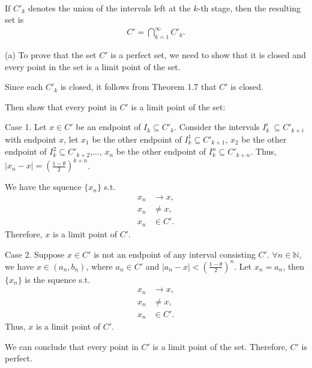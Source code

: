 \documentclass[UTF8,a4paper,10pt]{article}
\begin{document}
  \begin{solution}\,

  If \(C'_k\) denotes the union of the intervals left at the
$k$-th stage, then the resulting set is
\begin{equation*}
  \begin{aligned}
    C' =  \bigcap_{k=1}^{\infty} C'_k  .
  \end{aligned}
\end{equation*}


  (a) To prove that the set \(C'\) is a perfect set, we need to show that it is closed and every point in the set is a limit point of the set.

  Since each \(C'_k\) is closed, it follows from Theorem 1.7 that \(C'\) is closed. 

  Then show that every point in \(C'\) is a limit point of the set:

  Case 1. Let \(x\in C'\) be an endpoint of \(I_k\subseteq C'_k\). Consider the intervals \(I_k^i\ \subseteq C'_{k+i}\) with endpoint \(x\), let \(x_1\) be the other endpoint of \(I_k^1\subseteq C'_{k+1}\), \(x_2\) be the other endpoint of \(I_k^2\subseteq C'_{k+2}\),..., \(x_n\) be the other endpoint of \(I_k^n
  \subseteq C'_{k+n}\).
  Thus, \(|x_n-x|=(\frac{1-\theta}{2})^{k+n}\).

  We have the squence \(\{x_n\}\) s.t. 
  \begin{equation*}
    \begin{aligned}
      x_n&\to x,\\
      x_n&\neq x,\\
      x_n&\in C'.
    \end{aligned}
  \end{equation*}
  Therefore, \(x\) is a limit point of \(C'\).

  Case 2. Suppose \(x\in C'\) is not an endpoint of any interval consisting \(C'\). \(\forall n\in\mathbb{N}\), we have \(x\in (a_n, b_n)\), where \(a_n\in C'\) and \(|a_n-x|<(\frac{1-\theta}{2})^{n}\). Let \(x_n = a_n\), then \(\{x_n\}\) is the squence s.t. 
  \begin{equation*}
    \begin{aligned}
      x_n&\to x,\\
      x_n&\neq x,\\
      x_n&\in C'.
    \end{aligned}
  \end{equation*}
  Thus, \(x\) is a limit point of \(C'\).

  We can conclude that every point in \(C'\) is a limit point of the set. Therefore, \(C'\) is perfect.


\end{solution}
\end{document}
